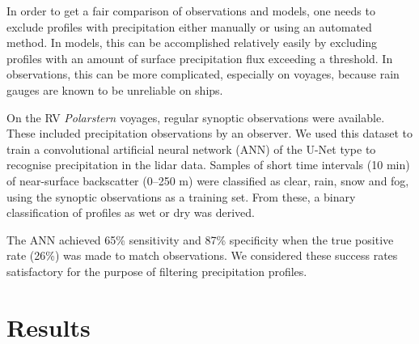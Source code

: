 \documentclass[12pt,a4paper]{article}
\begin{document}
In order to get a fair comparison of observations and models, one needs to
exclude profiles with precipitation either manually or using an automated
method. In models, this can be accomplished relatively easily by excluding
profiles with an amount of surface precipitation flux exceeding a threshold.
In observations, this can be more complicated, especially on voyages, because
rain gauges are known to be unreliable on ships.

On the RV \emph{Polarstern} voyages, regular synoptic observations were
available.  These included precipitation observations by an observer. We
used this dataset to train a convolutional artiﬁcial neural network (ANN)
of the U-Net type \citep{ronneberger2015} to recognise precipitation in the
lidar data. Samples of short time intervals (10 min) of near-surface
backscatter (0–250 m) were classified as clear, rain, snow and fog, using the
synoptic observations as a training set. From these, a binary classification of
profiles as wet or dry was derived.

The ANN achieved 65\% sensitivity and 87\% speciﬁcity when the true positive
rate (26\%) was made to match observations. We considered these success rates
satisfactory for the purpose of filtering precipitation profiles.

\section{Results}
\label{sec:results}
\end{document}
